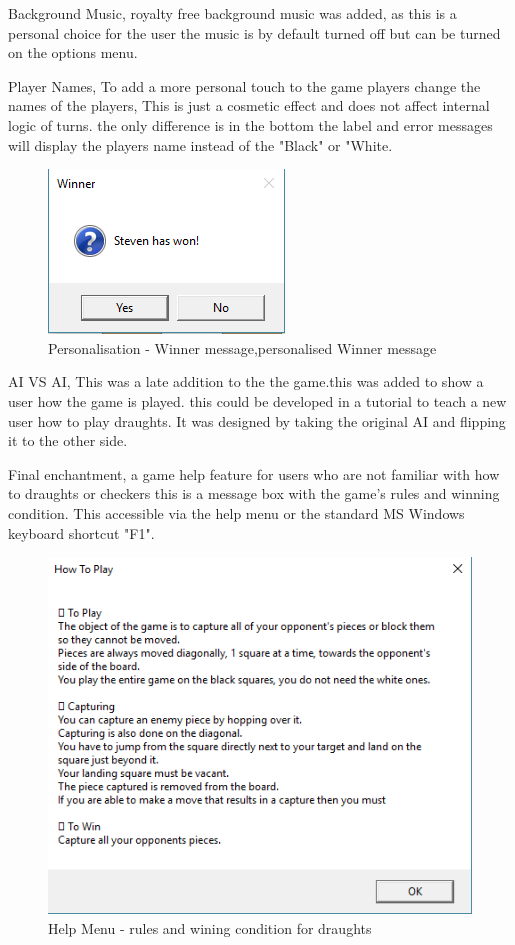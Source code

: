 \documentclass[10pt, a4paper]{article}
\begin{document}
Background Music, royalty free background music was added, as this is a personal choice for the user the music is by default turned off but can be turned on the options menu.

Player Names, To add a more personal touch to the game players change the names of the players, This is just a cosmetic effect and does not affect internal logic of turns. the only difference is in the bottom the label and error messages will display the players name instead of the "Black" or "White.
\begin{figure}[H]
  	\centering
  	\includegraphics[scale = 0.75]{Winner}
	\caption{Personalisation  - Winner message,personalised Winner message}
  	\label{fig:nonfloat}
	\end{figure}

AI VS AI, This was a late addition to the the game.this was added to show a user how the game is played. this could be developed in a tutorial to teach a new user how to play draughts.  It was designed by taking the original AI and flipping it to the other side.

Final enchantment, a game help feature for users who are not familiar with how to draughts or checkers this is a message box with the game's rules and winning condition. This accessible via the help menu or the standard MS Windows keyboard shortcut "F1".
\begin{figure}[H]
  	\centering
  	\includegraphics[scale = 0.6]{Help}
	\caption{Help Menu  - rules and wining condition for draughts}
  	\label{fig:nonfloat}
	\end{figure}
\end{document}
